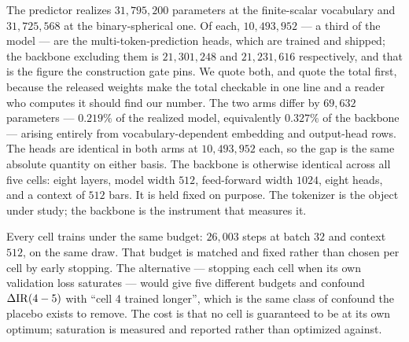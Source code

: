The predictor realizes $31{,}795{,}200$ parameters at the finite-scalar vocabulary and
$31{,}725{,}568$ at the binary-spherical one. Of each, $10{,}493{,}952$ --- a third of the model
--- are the multi-token-prediction heads, which are trained and shipped; the backbone excluding
them is $21{,}301{,}248$ and $21{,}231{,}616$ respectively, and that is the figure the
construction gate pins. We quote both, and quote the total first, because the released weights
make the total checkable in one line and a reader who computes it should find our number. The two
arms differ by $69{,}632$ parameters --- $0.219\%$ of the realized model, equivalently $0.327\%$
of the backbone --- arising entirely from vocabulary-dependent embedding and output-head rows.
The heads are identical in both arms at $10{,}493{,}952$ each, so the gap is the same absolute
quantity on either basis. The backbone
is otherwise identical across all five cells: eight layers, model width $512$, feed-forward width
$1024$, eight heads, and a context of $512$ bars. It is held fixed on purpose. The tokenizer is
the object under study; the backbone is the instrument that measures it.

Every cell trains under the same budget: $26{,}003$ steps at batch $32$ and context $512$, on the
same draw. That budget is matched and fixed rather than chosen per cell by early stopping. The
alternative --- stopping each cell when its own validation loss saturates --- would give five
different budgets and confound $\Delta\mathrm{IR}(4-5)$ with ``cell 4 trained longer'', which is the same
class of confound the placebo exists to remove. The cost is that no cell is guaranteed to be at
its own optimum; saturation is measured and reported rather than optimized against.

